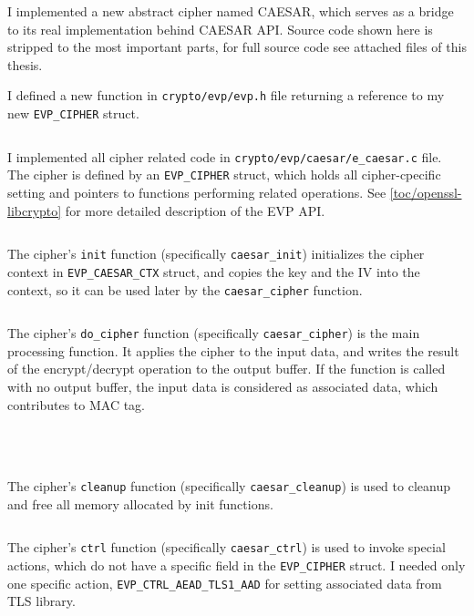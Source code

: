 I implemented a new abstract cipher named CAESAR, which serves as a bridge to its real implementation behind CAESAR API. Source code shown here is stripped to the most important parts, for full source code see attached files of this thesis.

I defined a new function in \texttt{crypto/evp/evp.h} file returning a reference to my new \texttt{EVP\_CIPHER} struct.

\inputminted{c}{code/openssl-evp-caesar.c}

I implemented all cipher related code in \texttt{crypto/evp/caesar/e\_caesar.c} file. The cipher is defined by an \texttt{EVP\_CIPHER} struct, which holds all cipher-cpecific setting and pointers to functions performing related operations. See \autoref{toc/openssl-libcrypto} for more detailed description of the EVP API.

\inputminted{c}{code/openssl/crypto/evp/caesar/e_caesar.c}

The cipher's \texttt{init} function (specifically \texttt{caesar\_init}) initializes the cipher context in \texttt{EVP\_CAESAR\_CTX} struct, and copies the key and the IV into the context, so it can be used later by the \texttt{caesar\_cipher} function.

\inputminted{c}{code/openssl/crypto/evp/caesar/e_caesar_init.c}

The cipher's \texttt{do\_cipher} function (specifically \texttt{caesar\_cipher}) is the main processing function. It applies the cipher to the input data, and writes the result of the encrypt/decrypt operation to the output buffer. If the function is called with no output buffer, the input data is considered as associated data, which contributes to MAC tag.

\inputminted{c}{code/openssl/crypto/evp/caesar/e_caesar_cipher.c}
\inputminted{c}{code/openssl/crypto/evp/caesar/e_caesar_set_ad.c}
\inputminted{c}{code/openssl/crypto/evp/caesar/e_caesar_encrypt.c}
\inputminted{c}{code/openssl/crypto/evp/caesar/e_caesar_decrypt.c}

The cipher's \texttt{cleanup} function (specifically \texttt{caesar\_cleanup}) is used to cleanup and free all memory allocated by init functions.

\inputminted{c}{code/openssl/crypto/evp/caesar/e_caesar_cleanup.c}

The cipher's \texttt{ctrl} function (specifically \texttt{caesar\_ctrl}) is used to invoke special actions, which do not have a specific field in the \texttt{EVP\_CIPHER} struct. I needed only one specific action, \texttt{EVP\_CTRL\_AEAD\_TLS1\_AAD} for setting associated data from TLS library.

